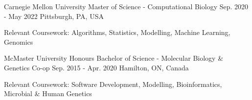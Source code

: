\begin{cventries}
   \cventry
   {Carnegie Mellon University}
       {Master of Science - Computational Biology}
       {Sep. 2020 - May 2022}
       {Pittsburgh, PA, USA} %
       {\begin{cvitems}
          \item{Relevant Coursework: Algorithms, Statistics, Modelling, Machine Learning, Genomics}
        \end{cvitems}
       }
   \cventry
       {McMaster University}
       {Honours Bachelor of Science - Molecular Biology \& Genetics Co-op}
       {Sep. 2015 - Apr. 2020}
       {Hamilton, ON, Canada} 
       {\begin{cvitems}
           \item{Relevant Coursework: Software Development, Modelling, Bioinformatics, Microbial \& Human Genetics}
        \end{cvitems}
       }
\end{cventries}
